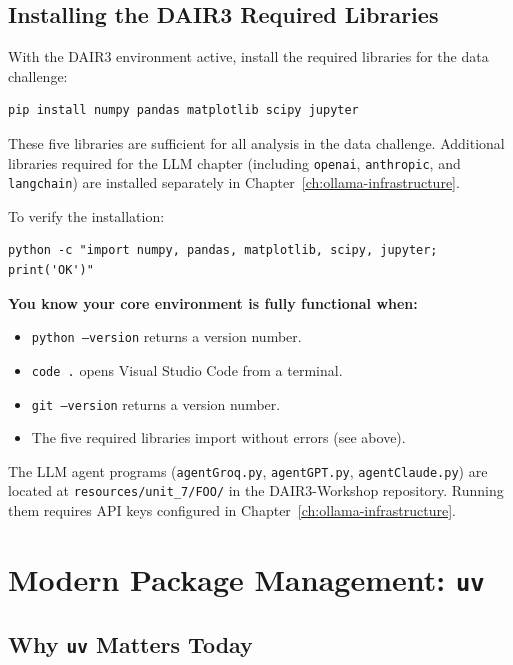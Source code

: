 \subsection{Installing the DAIR3 Required Libraries}
\label{sec:dair3-libraries}

With the DAIR3 environment active, install the required libraries for
the data challenge:

\begin{verbatim}
pip install numpy pandas matplotlib scipy jupyter
\end{verbatim}

These five libraries are sufficient for all analysis in the data
challenge. Additional libraries required for the LLM chapter (including
\texttt{openai}, \texttt{anthropic}, and \texttt{langchain}) are
installed separately in Chapter~\ref{ch:ollama-infrastructure}.

\vs
\noindent
To verify the installation:

\begin{verbatim}
python -c "import numpy, pandas, matplotlib, scipy, jupyter; print('OK')"
\end{verbatim}

\vs
\noindent
\textbf{You know your core environment is fully functional when:}
\begin{itemize}
    \item \texttt{python --version} returns a version number.
    \item \texttt{code .} opens Visual Studio Code from a terminal.
    \item \texttt{git --version} returns a version number.
    \item The five required libraries import without errors (see above).
\end{itemize}
The LLM agent programs (\texttt{agentGroq.py}, \texttt{agentGPT.py},
\texttt{agentClaude.py}) are located at
\texttt{resources/unit\_7/FOO/} in the DAIR3-Workshop repository.
Running them requires API keys configured in
Chapter~\ref{ch:ollama-infrastructure}.
\vs

\section{Modern Package Management: \texttt{uv}}
\label{sec:uv}

\subsection{Why \texttt{uv} Matters Today}

